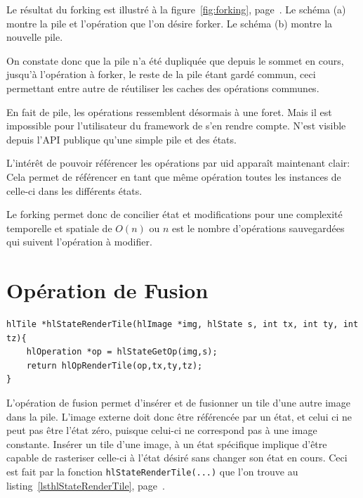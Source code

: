 			Le résultat du forking est illustré à la figure~\ref{fig:forking}, page~\pageref{fig:forking}. Le schéma (a) montre la pile et l'opération
			que l'on désire forker. Le schéma (b) montre la nouvelle pile. 
			
			On constate donc que la pile n'a été dupliquée que depuis le sommet en cours, jusqu'à l'opération à forker, le reste de la pile 
			étant gardé commun, ceci permettant entre autre de réutiliser les caches des opérations communes. 

			En fait de pile, les opérations ressemblent désormais à une foret. Mais il est impossible pour l'utilisateur du framework de s'en
			rendre compte. N'est visible depuis l'API publique qu'une simple pile et des états.

			L'intérêt de pouvoir référencer les opérations par uid apparaît maintenant clair: Cela permet de référencer en tant que même 
			opération toutes les instances de celle-ci dans les différents états.  

			Le forking permet donc de concilier état et modifications pour une complexité temporelle et spatiale de $O(n)$ ou $n$ est le nombre
			d'opérations sauvegardées qui suivent l'opération à modifier.
	\section{Opération de Fusion}
		\begin{lstlisting}[float,caption={Rasterisation d'opérations},frame=tb,label=lsthlStateRenderTile]
hlTile *hlStateRenderTile(hlImage *img, hlState s, int tx, int ty, int tz){
	hlOperation *op = hlStateGetOp(img,s);
	return hlOpRenderTile(op,tx,ty,tz);
}
		\end{lstlisting}
		L'opération de fusion permet d'insérer et de fusionner un tile d'une autre image dans la pile. L'image externe doit donc être référencée par
		un état, et celui ci ne peut pas être l'état zéro, puisque celui-ci ne correspond pas à une image constante.  Insérer un tile d'une image,
		à un état spécifique implique d'être capable de rasteriser celle-ci à l'état désiré sans changer son état en cours. Ceci est fait par la
		fonction \lstinline$hlStateRenderTile(...)$ que l'on trouve au listing~\ref{lsthlStateRenderTile}, page~\pageref{lsthlStateRenderTile}.

